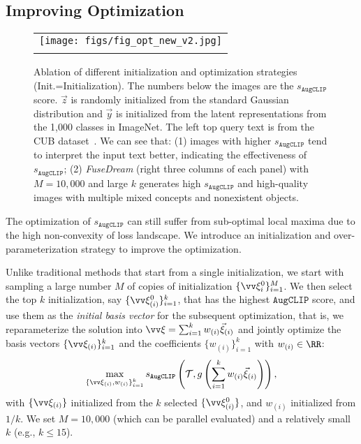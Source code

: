\documentclass[10pt,twocolumn,letterpaper]{article}
\newcommand{\our}{\emph{FuseDream}}
\newcommand{\ourloss}{\texttt{AugCLIP}}
\begin{document}
\subsection{Improving Optimization}
\label{subsec:strategy}
\begin{figure*}
    \centering
    \begin{tabular}{c} 
    \texttt{[image: figs/fig\_opt\_new\_v2.jpg]} \\
    \vspace{-15pt}
    \end{tabular}
\caption{
Ablation of different initialization and optimization strategies (Init.=Initialization). 
The numbers below the images are the  $s_{\ourloss}$ score.
$\vec z$ is randomly initialized from the standard Gaussian distribution and $\vec y$ is initialized from the latent representations from the 1,000 classes in ImageNet.
The left top query text is from the CUB dataset~\cite{welinder2010caltech}. 
We can see that: 
(1) images with higher $s_{\ourloss}$  tend to  interpret the input text better,  indicating the effectiveness of $s_{\ourloss}$; 
(2) {\our} (right three columns of each panel) 
with $M=10,000$ and large $k$ generates high $s_{\ourloss}$ and high-quality images with multiple mixed concepts and nonexistent objects.
}
    \label{fig:opt}
\end{figure*}
The optimization 
of $s_{\ourloss}$ can still suffer from sub-optimal local maxima 
due to the high non-convexity of loss landscape. 
We introduce 
an initialization and over-parameterization strategy to 
  improve the optimization.  



Unlike traditional methods that start from a single initialization,
we start with sampling a large number $M$ of copies of initialization  $\{\vv \xi_i^0\}_{i=1}^M$. We then select the top $k$ initialization, say $\{\vv \xi_{(i)}^0\}_{i=1}^k$, that has the highest $\ourloss$ score,  and use them as the \emph{initial basis vector} for the subsequent optimization, that is, we reparameterize the solution into $\vv \xi = \sum_{i=1}^k w_{(i)} \vec \xi_{(i)} $ and jointly optimize the basis vectors $\{\vv \xi_{(i)}\}_{i=1}^k$ and the coefficients $\{w_{(i)}\}_{i=1}^k$ with $w_{(i)} \in \RR$: 
\begin{align}
    \label{eq:final_loss}
    \max_{\{\vv \xi_{(i)},  w_{(i)} \}_{i=1}^k} s_{\ourloss} \left (\mathcal{T}, g\left (\sum_{i=1}^k w_{(i)} \vec \xi_{(i)} \right) \right ), 
\end{align}
with $\{\vv \xi_{(i)}\}$ initialized from 
the  $k$ selected $\{\vv \xi_{(i)}^0\}$, and $w_{(i)}$ initialized from $1/k$. 
We set $M=10,000$ (which can be parallel evaluated)  and a relatively small $k$ (e.g., $k \leq 15$).
\end{document}
